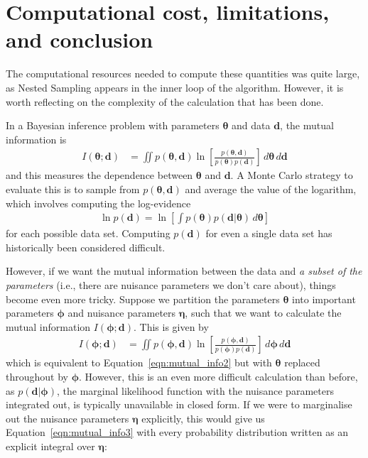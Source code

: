 \documentclass[entropy,article,accept,oneauthor,pdftex,10pt,a4paper]{mdpi}
\renewcommand{\d}{\boldsymbol{d}}
\newcommand{\x}{\boldsymbol{\theta}}
\newcommand{\bphi}{\boldsymbol{\phi}}
\newcommand{\boldeta}{\boldsymbol{\eta}}
\begin{document}
\section{Computational cost, limitations, and conclusion}

The computational resources needed to compute these quantities was quite large,
as Nested Sampling appears in the inner loop of the algorithm.
However, it is worth reflecting on the complexity of the calculation that
has been done.

In a Bayesian inference problem with parameters $\x$ and data $\d$, the
mutual information is
\begin{align}
I(\x; \d) &= \iint p(\x, \d)
                        \ln \left[\frac{p(\x, \d)}{p(\x)p(\d)}\right]
                        \, d\x \, d\d \label{eqn:mutual_info2}
\end{align}
and this measures the dependence between $\x$ and $\d$. A
Monte Carlo
strategy to evaluate this is to sample from $p(\x, \d)$ and average
the value of the logarithm, which involves computing the log-evidence
\begin{align}
\ln p(\d) = \ln\left[\int p(\x)p(\d | \x) \, d\x\right]
\end{align}
for each possible data set.
Computing $p(\d)$ for even a single
data set has historically been considered difficult.

However, if we want the mutual information between the data and
{\em a subset of the parameters} (i.e., there are nuisance parameters
we don't care about), things become even more tricky. Suppose we
partition the parameters $\x$ into important parameters
$\bphi$ and nuisance parameters $\boldeta$, such that we want to calculate
the mutual information $I(\bphi; \d)$. This is given by
\begin{align}
I(\bphi; \d) &= \iint p(\bphi, \d)
                        \ln \left[\frac{p(\bphi, \d)}{p(\bphi)p(\d)}\right]
                        \, d\bphi \, d\d \label{eqn:mutual_info3}
\end{align}
which is equivalent to Equation~\ref{eqn:mutual_info2} but with
$\x$ replaced throughout by $\bphi$. However, this is an even more
difficult calculation than before, as $p(\d | \bphi)$, the marginal likelihood
function with the nuisance parameters integrated out, is typically
unavailable in closed form. If we were to marginalise out the nuisance
parameters $\boldeta$ explicitly, this would give us
Equation~\ref{eqn:mutual_info3} with every probability distribution
written as an explicit integral over $\boldeta$:
\end{document}
